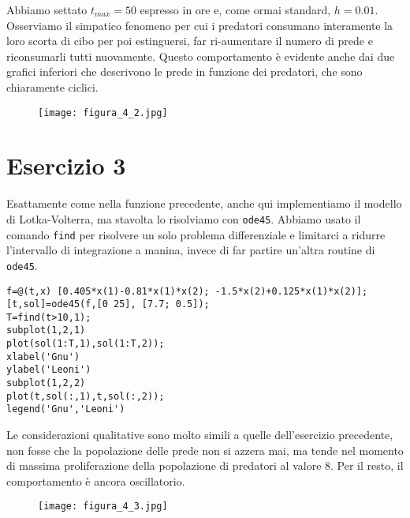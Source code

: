 \documentclass{article}
\begin{document}
\noindent
Abbiamo settato $t_{max}=50$ espresso in ore e, come ormai standard, $h=0.01$. Osserviamo il simpatico fenomeno per cui i predatori consumano interamente la loro scorta di cibo per poi estinguersi, far ri-aumentare il numero di prede e riconsumarli tutti nuovamente. Questo comportamento è evidente anche dai due grafici inferiori che descrivono le prede in funzione dei predatori, che sono chiaramente ciclici.

\begin{figure}[!h]
\centering
\texttt{[image: figura\_4\_2.jpg]}
\end{figure}

\clearpage

\section*{Esercizio 3}

Esattamente come nella funzione precedente, anche qui implementiamo il modello di Lotka-Volterra, ma stavolta lo risolviamo con \texttt{ode45}. Abbiamo usato il comando \texttt{find} per risolvere un solo problema differenziale e limitarci a ridurre l'intervallo di integrazione a manina, invece di far partire un'altra routine di \texttt{ode45}.
\begin{lstlisting}
f=@(t,x) [0.405*x(1)-0.81*x(1)*x(2); -1.5*x(2)+0.125*x(1)*x(2)];
[t,sol]=ode45(f,[0 25], [7.7; 0.5]);
T=find(t>10,1);
subplot(1,2,1) 
plot(sol(1:T,1),sol(1:T,2));
xlabel('Gnu')
ylabel('Leoni')
subplot(1,2,2)
plot(t,sol(:,1),t,sol(:,2));
legend('Gnu','Leoni')
\end{lstlisting}

\noindent
Le considerazioni qualitative sono molto simili a quelle dell'esercizio precedente, non fosse che la popolazione delle prede non si azzera mai, ma tende nel momento di massima proliferazione della popolazione di predatori al valore $8$. Per il resto, il comportamento è ancora oscillatorio.

\begin{figure}[!h]
\centering
\texttt{[image: figura\_4\_3.jpg]}
\end{figure}

\newpage
\end{document}
